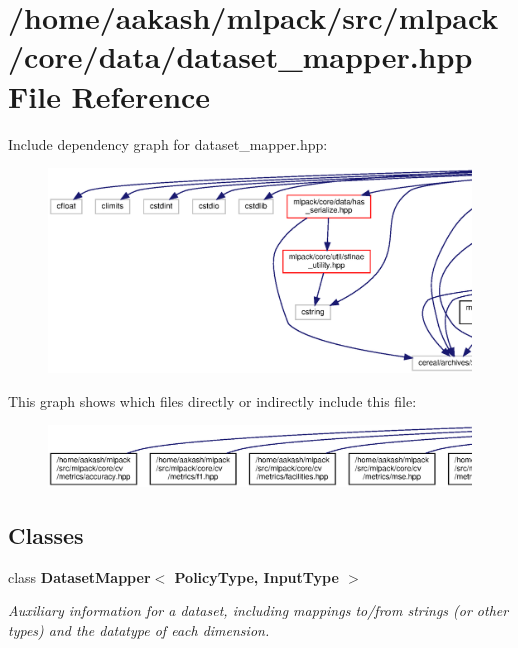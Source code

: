 \section{/home/aakash/mlpack/src/mlpack/core/data/dataset\+\_\+mapper.hpp File Reference}
\label{dataset__mapper_8hpp}
Include dependency graph for dataset\+\_\+mapper.\+hpp\+:
\nopagebreak
\begin{figure}[H]
\begin{center}
\leavevmode
\includegraphics[width=350pt]{dataset__mapper_8hpp__incl}
\end{center}
\end{figure}
This graph shows which files directly or indirectly include this file\+:
\nopagebreak
\begin{figure}[H]
\begin{center}
\leavevmode
\includegraphics[width=350pt]{dataset__mapper_8hpp__dep__incl}
\end{center}
\end{figure}
\subsection*{Classes}
\begin{DoxyCompactItemize}
\item 
class \textbf{ Dataset\+Mapper$<$ Policy\+Type, Input\+Type $>$}
\begin{DoxyCompactList}\small\item\em Auxiliary information for a dataset, including mappings to/from strings (or other types) and the datatype of each dimension. \end{DoxyCompactList}\end{DoxyCompactItemize}
